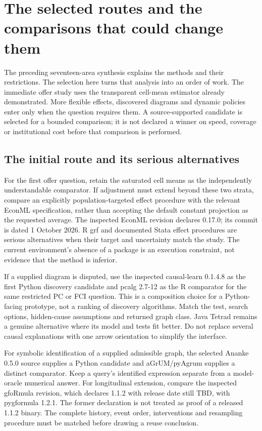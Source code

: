 \section{The selected routes and the comparisons that could change them}
\label{rewrite:software-selection}

The preceding seventeen-area synthesis explains the methods and their
restrictions. The selection here turns that analysis into an order of work.
The immediate offer study uses the transparent cell-mean estimator already
demonstrated. More flexible effects, discovered diagrams and dynamic policies
enter only when the question requires them. A source-supported candidate is
selected for a bounded comparison; it is not declared a winner on speed,
coverage or institutional cost before that comparison is performed.

\subsection{The initial route and its serious alternatives}
For the first offer question, retain the saturated cell means as the
independently understandable comparator. If adjustment must extend beyond
these two strata, compare an explicitly population-targeted effect procedure
with the relevant EconML specification, rather than accepting the default
constant projection as the requested average. The inspected EconML revision
declares 0.17.0; its commit is dated 1 October 2026. R grf and documented
Stata effect procedures are serious alternatives when their target and
uncertainty match the study. The current environment's absence of a package
is an execution constraint, not evidence that the method is inferior.
\citep{exec19_econml_source,exec13_grf_rpath,exec13_ch_stata}

If a supplied diagram is disputed, use the inspected causal-learn 0.1.4.8
as the first Python discovery candidate and pcalg 2.7-12 as the R comparator
for the same restricted PC or FCI question. This is a composition choice
for a Python-facing prototype, not a ranking of discovery algorithms.
Match the test, search options, hidden-cause assumptions and returned graph
class. Java Tetrad remains a genuine alternative where its model and tests
fit better. Do not replace several causal explanations with one arrow
orientation to simplify the interface.
\citep{v12_sw_causallearn,exec13_pcalg_reuse_primary,exec13_java_tetrad}

For symbolic identification of a supplied admissible graph, the selected
Ananke 0.5.0 source supplies a Python candidate and aGrUM/pyAgrum supplies
a distinct comparator. Keep a query's identified expression separate from
a model-oracle numerical answer. For longitudinal extension, compare the
inspected gfoRmula revision, which declares 1.1.2 with release date still
TBD, with pygformula 1.2.1. The former declaration is not treated as proof
of a released 1.1.2 binary. The complete history, event order, interventions
and resampling procedure must be matched before drawing a reuse conclusion.
\citep{exec24_ananke_source,exec19_cxx_identification_source,
exec24_agrum_source,exec20_gformula_reuse,exec24_longpy_pygformula_source}

